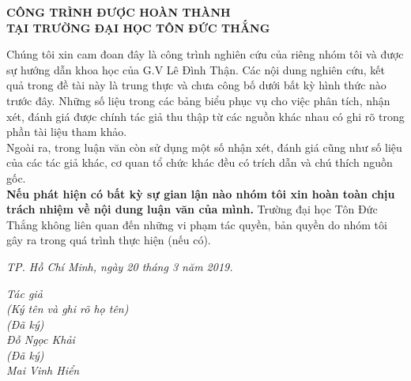 \documentclass{article}
\begin{document}
	\newpage
	\begin{center}
		\fontsize{16pt}{22pt}\selectfont
		\textbf{CÔNG TRÌNH ĐƯỢC HOÀN THÀNH}
		\textbf{\\TẠI TRƯỜNG ĐẠI HỌC TÔN ĐỨC THẮNG}
	\end{center}
	\fontsize{13pt}{18pt}\selectfont
	\begin{flushleft}
		\bigskip
		\hspace{0.86cm} 
		Chúng tôi xin cam đoan đây là công trình nghiên cứu của riêng nhóm tôi và được sự hướng dẫn khoa học của G.V Lê Đình Thận. Các nội dung nghiên cứu, kết quả trong đề tài này là trung thực và chưa công bố dưới bất kỳ hình thức nào trước đây. Những số liệu trong các bảng biểu phục vụ cho việc phân tích, nhận xét, đánh giá được chính tác giả thu thập từ các nguồn khác nhau có ghi rõ trong phần tài liệu tham khảo.\\
		\hspace{0.86cm}
		Ngoài ra, trong luận văn còn sử dụng một số nhận xét, đánh giá cũng như số liệu của các tác giả khác, cơ quan tổ chức khác đều có trích dẫn và chú thích nguồn gốc.\\
		\hspace{0.86cm}
		\textbf{Nếu phát hiện có bất kỳ sự gian lận nào nhóm tôi xin hoàn toàn chịu trách nhiệm về nội dung luận văn của mình.} 
		Trường đại học Tôn Đức Thắng không liên quan đến những vi phạm tác quyền, bản quyền do nhóm tôi gây ra trong quá trình thực hiện (nếu có).
	\end{flushleft}
	\hspace{6cm}
	\textit{TP. Hồ Chí Minh, ngày 20 tháng 3 năm 2019.}
	\begin{flushleft}
		\fontsize{13pt}{18pt}\selectfont
		\hspace{10cm}
		\textit{Tác giả\\}
		\hspace{8.5cm}
		\textit{(Ký tên và ghi rõ họ tên)\\}
		\vspace{1cm}
		\hspace{10cm}
		\textit{(Đã ký)\\}
		\hspace{9.5cm}
		\textit{Đỗ Ngọc Khải\\[10pt]}
		\vspace{1cm}
		\hspace{10cm}
		\textit{(Đã ký)\\}
		\hspace{9.5cm}
		\smallskip
		\textit{Mai Vinh Hiển\\}
	\end{flushleft}
\end{document}
